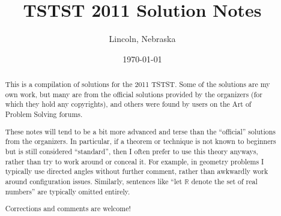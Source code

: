 \documentclass[11pt]{scrartcl}
\begin{document}
\title{TSTST 2011 Solution Notes}
\subtitle{Lincoln, Nebraska}
\date{\today}

\maketitle
\begin{abstract}
This is a compilation of solutions
for the 2011 TSTST.
Some of the solutions are my own work,
but many are from the official solutions provided by the organizers
(for which they hold any copyrights),
and others were found by users on the Art of Problem Solving forums.

These notes will tend to be a bit more advanced and terse than the ``official''
solutions from the organizers.
In particular, if a theorem or technique is not known to beginners
but is still considered ``standard'', then I often prefer to
use this theory anyways, rather than try to work around or conceal it.
For example, in geometry problems I typically use directed angles
without further comment, rather than awkwardly work around configuration issues.
Similarly, sentences like ``let $\mathbb{R}$ denote the set of real numbers''
are typically omitted entirely.

Corrections and comments are welcome!
\end{abstract}
\tableofcontents
\newpage

\addtocounter{section}{-1}
\end{document}
